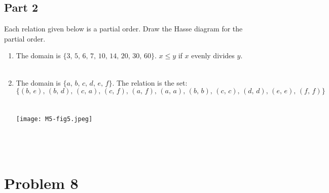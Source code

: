 \subsection*{Part 2}
Each relation given below is a partial order. Draw the Hasse diagram for the partial order.

\begin{enumerate}[label=(\alph*)]
\item The domain is $\{3,\, 5,\, 6,\, 7,\, 10,\, 14,\, 20,\, 30,\, 60\}$. $x \leq y$ if $x$ evenly divides $y$.\\\\
\item The domain is $\{a,\, b,\, c,\, d,\, e,\, f\}$. The relation is the set:
\[
\{ (b,\, e),\, (b,\, d),\, (c,\, a),\, (c,\, f),\, (a,\, f),\, (a,\, a),\, (b,\, b),\, (c, \,c),\, (d,\, d),\, (e, \,e), \,(f,\, f) \}
\]\\\\
\texttt{[image: M5-fig5.jpeg]}
\\\\
\\\\

\end{enumerate}

\newpage%

\section*{Problem 8}

